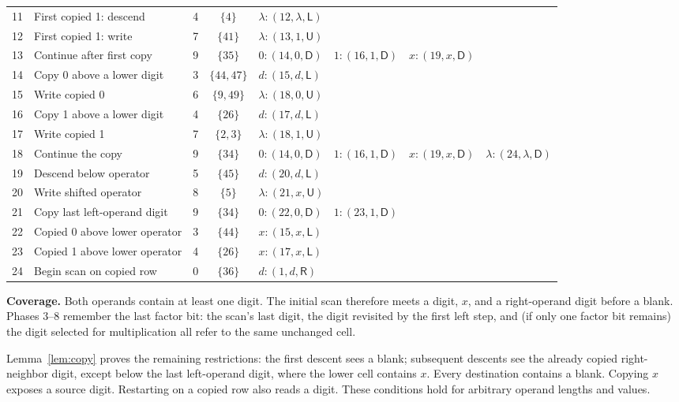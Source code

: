 \documentclass[11pt,a4paper]{article}
\newcommand{\blank}{\lambda}
\newcommand{\triple}[3]{(#1,#2,\mathsf{#3})}
\begin{document}
\begin{center}
\begin{tabularx}{\textwidth}{r p{5.5cm} c c X}
11 & First copied 1: descend & 4 & $\{4\}$ & $\blank:\triple{12}{\blank}{L}$ \\
12 & First copied 1: write & 7 & $\{41\}$ & $\blank:\triple{13}{1}{U}$ \\
13 & Continue after first copy & 9 & $\{35\}$ & $0:\triple{14}{0}{D}\quad 1:\triple{16}{1}{D}\quad x:\triple{19}{x}{D}$ \\
14 & Copy 0 above a lower digit & 3 & $\{44,47\}$ & $d:\triple{15}{d}{L}$ \\
15 & Write copied 0 & 6 & $\{9,49\}$ & $\blank:\triple{18}{0}{U}$ \\
16 & Copy 1 above a lower digit & 4 & $\{26\}$ & $d:\triple{17}{d}{L}$ \\
17 & Write copied 1 & 7 & $\{2,3\}$ & $\blank:\triple{18}{1}{U}$ \\
18 & Continue the copy & 9 & $\{34\}$ & $0:\triple{14}{0}{D}\quad 1:\triple{16}{1}{D}\quad x:\triple{19}{x}{D}\quad \blank:\triple{24}{\blank}{D}$ \\
19 & Descend below operator & 5 & $\{45\}$ & $d:\triple{20}{d}{L}$ \\
20 & Write shifted operator & 8 & $\{5\}$ & $\blank:\triple{21}{x}{U}$ \\
21 & Copy last left-operand digit & 9 & $\{34\}$ & $0:\triple{22}{0}{D}\quad 1:\triple{23}{1}{D}$ \\
22 & Copied 0 above lower operator & 3 & $\{44\}$ & $x:\triple{15}{x}{L}$ \\
23 & Copied 1 above lower operator & 4 & $\{26\}$ & $x:\triple{17}{x}{L}$ \\
24 & Begin scan on copied row & 0 & $\{36\}$ & $d:\triple{1}{d}{R}$ \\
\bottomrule
\end{tabularx}
\end{center}

\textbf{Coverage.} Both operands contain at least one digit. The initial scan therefore
meets a digit, $x$, and a right-operand digit before a blank. Phases $3$--$8$
remember the last factor bit: the scan's last digit, the digit revisited
by the first left step, and (if only one factor bit remains) the digit
selected for multiplication all refer to the same unchanged cell.

Lemma~\ref{lem:copy} proves the remaining restrictions: the first descent
sees a blank; subsequent descents see the already copied right-neighbor
digit, except below the last left-operand digit, where the lower cell
contains $x$. Every destination contains a blank. Copying $x$ exposes a
source digit. Restarting on a copied row also reads a digit. These conditions
hold for arbitrary operand lengths and values.
\end{document}
